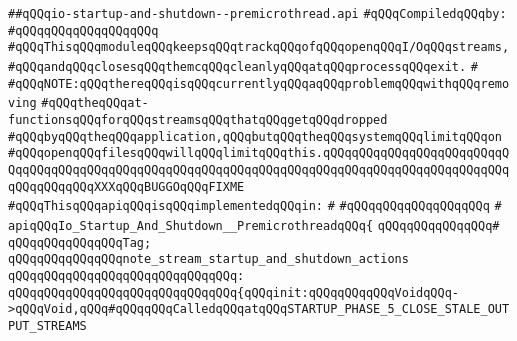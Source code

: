 \label{src/lib/std/src/io/io-startup-and-shutdown--premicrothread.api}
\verb|##qQQqio-startup-and-shutdown--premicrothread.api|\newline
\newline
\verb|#qQQqCompiledqQQqby:|\newline
\verb|#qQQqqQQqqQQqqQQqqQQq|\newline
\newline
\newline
\verb|#qQQqThisqQQqmoduleqQQqkeepsqQQqtrackqQQqofqQQqopenqQQqI/OqQQqstreams,|\newline
\verb|#qQQqandqQQqclosesqQQqthemcqQQqcleanlyqQQqatqQQqprocessqQQqexit.|\newline
\verb|#|\newline
\verb|#qQQqNOTE:qQQqthereqQQqisqQQqcurrentlyqQQqaqQQqproblemqQQqwithqQQqremoving|\newline
\verb|#qQQqtheqQQqat-functionsqQQqforqQQqstreamsqQQqthatqQQqgetqQQqdropped|\newline
\verb|#qQQqbyqQQqtheqQQqapplication,qQQqbutqQQqtheqQQqsystemqQQqlimitqQQqon|\newline
\verb|#qQQqopenqQQqfilesqQQqwillqQQqlimitqQQqthis.qQQqqQQqqQQqqQQqqQQqqQQqqQQqqQQqqQQqqQQqqQQqqQQqqQQqqQQqqQQqqQQqqQQqqQQqqQQqqQQqqQQqqQQqqQQqqQQqqQQqqQQqqQQqXXXqQQqBUGGOqQQqFIXME|\newline
\newline
\newline
\verb|#qQQqThisqQQqapiqQQqisqQQqimplementedqQQqin:|\newline
\verb|#|\newline
\verb|#qQQqqQQqqQQqqQQqqQQq|\newline
\verb|#|\newline
\verb|apiqQQqIo_Startup_And_Shutdown__PremicrothreadqQQq{|\newline
\verb|qQQqqQQqqQQqqQQq#|\newline
\verb|qQQqqQQqqQQqqQQqTag;|\newline
\newline
\verb|qQQqqQQqqQQqqQQqnote_stream_startup_and_shutdown_actions|\newline
\verb|qQQqqQQqqQQqqQQqqQQqqQQqqQQqqQQq:|\newline
\verb|qQQqqQQqqQQqqQQqqQQqqQQqqQQqqQQq{qQQqinit:qQQqqQQqqQQqVoidqQQq->qQQqVoid,qQQq#qQQqqQQqCalledqQQqatqQQqSTARTUP_PHASE_5_CLOSE_STALE_OUTPUT_STREAMS|\newline
